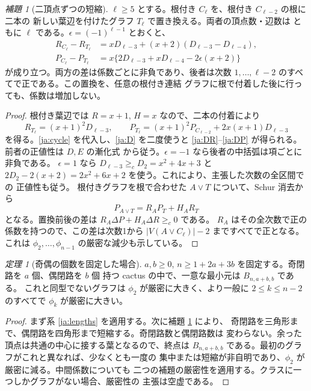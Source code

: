 \documentclass[12pt]{amsart}
\theoremstyle{definition}
\theoremstyle{remark}
\numberwithin{equation}{section}
\newtheorem{jthm}[thm]{定理}
\newtheorem{jlem}[thm]{補題}
\begin{document}
\begin{jlem}[二頂点ずつの短縮]\label{ja:shorten}
$\ell\ge5$ とする。根付き $C_\ell$ を、根付き $C_{\ell-2}$ の根に二本の
新しい葉辺を付けたグラフ $T_\ell$ で置き換える。両者の頂点数・辺数は
ともに $\ell$ である。$\epsilon=(-1)^{\ell-1}$ とおくと、
\begin{align}
 R_{C_\ell}-R_{T_\ell}
   &=xD_{\ell-3}+(x+2)(D_{\ell-3}-D_{\ell-4}),\label{ja:DR}\\
 P_{C_\ell}-P_{T_\ell}
   &=x\{2D_{\ell-3}+xD_{\ell-4}-2\epsilon(x+2)\}\label{ja:DP}
\end{align}
が成り立つ。両方の差は係数ごとに非負であり、後者は次数
$1,\ldots,\ell-2$ のすべてで正である。この置換を、任意の根付き連結
グラフに根で付着した後に行っても、係数は増加しない。
\end{jlem}
\begin{proof}
根付き葉辺では $R=x+1$, $H=x$ なので、二本の付着により
\[
 R_{T_\ell}=(x+1)^2D_{\ell-3},\qquad
 P_{T_\ell}=(x+1)^2P_{C_{\ell-2}}+2x(x+1)D_{\ell-3}
\]
を得る。\eqref{ja:cycle} を代入し、\eqref{ja:D} を二度使うと
\eqref{ja:DR}--\eqref{ja:DP} が得られる。前者の正値性は $D,E$ の漸化式
から従う。$\epsilon=-1$ なら後者の中括弧は項ごとに非負である。
$\epsilon=1$ なら $D_{\ell-3}\ge_c D_2=x^2+4x+3$ と
$2D_2-2(x+2)=2x^2+6x+2$ を使う。これにより、主張した次数の全区間での
正値性も従う。
根付きグラフを根で合わせた $A\vee T$ について、Schur 消去から
\begin{equation}\label{ja:coalesce}
 P_{A\vee T}=R_A P_T+H_A R_T
\end{equation}
となる。置換前後の差は $R_A\Delta P+H_A\Delta R\ge_c0$ である。
$R_A$ はその全次数で正の係数を持つので、この差は次数1から
$|V(A\vee C_\ell)|-2$ まですべてで正となる。これは
$\phi_2,\ldots,\phi_{n-1}$ の厳密な減少も示している。
\end{proof}

\begin{jthm}[奇偶の個数を固定した場合]\label{ja:parity}
$a,b\ge0$, $n\ge1+2a+3b$ を固定する。奇閉路を $a$ 個、偶閉路を $b$ 個
持つ cactus の中で、一意な最小元は $B_{n,a+b,b}$ である。
これと同型でないグラフは $\phi_2$ が厳密に大きく、より一般に
$2\le k\le n-2$ のすべてで $\phi_k$ が厳密に大きい。
\end{jthm}
\begin{proof}
まず系 \ref{ja:lengths} を適用する。次に補題 \ref{ja:shorten} により、
奇閉路を三角形まで、偶閉路を四角形まで短縮する。奇閉路数と偶閉路数は
変わらない。余った頂点は共通の中心に接する葉となるので、終点は
$B_{n,a+b,b}$ である。最初のグラフがこれと異なれば、少なくとも一度の
集中または短縮が非自明であり、$\phi_2$ が厳密に減る。中間係数についても
二つの補題の厳密性を適用する。クラスに一つしかグラフがない場合、厳密性の
主張は空虚である。
\end{proof}
\end{document}
